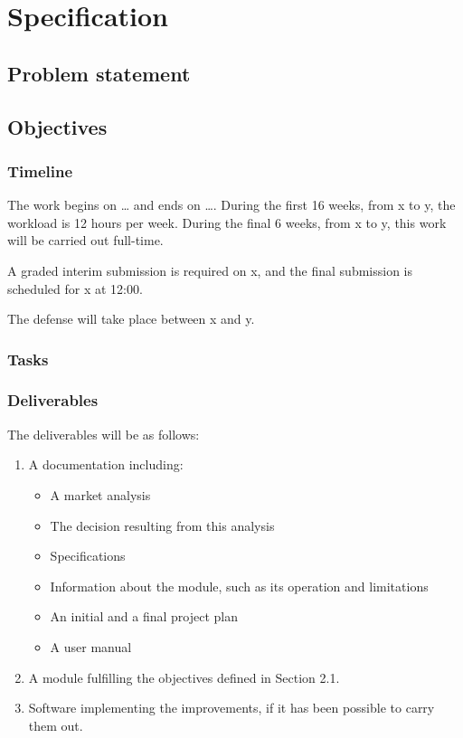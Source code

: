 %

\chapter{Specification}


\section*{Problem statement}
\lipsum[110-111]

\section*{Objectives}
\lipsum[1-1]

\subsection*{Timeline}
The work begins on … and ends on …. During the first 16 weeks, from x to y, the workload is 12 hours per week. During the final 6 weeks, from x to y, this work will be carried out full-time.

A graded interim submission is required on x, and the final submission is scheduled for x at 12:00.

The defense will take place between x and y.

\subsection*{Tasks}
\lipsum[1-1]

\subsection*{Deliverables}
The deliverables will be as follows:
\begin{enumerate}
	\item A documentation including:
	      \begin{itemize}
		      \item A market analysis
		      \item The decision resulting from this analysis
		      \item Specifications
		      \item Information about the module, such as its operation and limitations
		      \item An initial and a final project plan
		      \item A user manual
	      \end{itemize}
	\item A module fulfilling the objectives defined in Section 2.1.
	\item Software implementing the improvements, if it has been possible to carry them out.
\end{enumerate}

